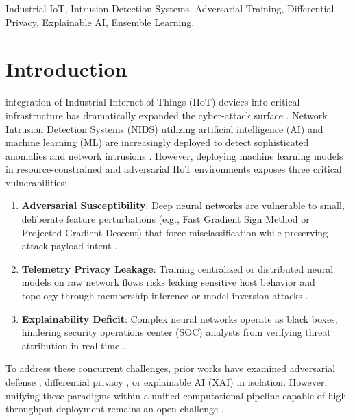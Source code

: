 \documentclass[10pt,journal,compsoc,twocolumn]{IEEEtran}
\begin{document}
\begin{IEEEkeywords}
Industrial IoT, Intrusion Detection Systems, Adversarial Training, Differential Privacy, Explainable AI, Ensemble Learning.
\end{IEEEkeywords}

\section{Introduction}
 integration of Industrial Internet of Things (IIoT) devices into critical infrastructure has dramatically expanded the cyber-attack surface \cite{harbi2024roadmap}. Network Intrusion Detection Systems (NIDS) utilizing artificial intelligence (AI) and machine learning (ML) are increasingly deployed to detect sophisticated anomalies and network intrusions \cite{khazane2024holistic, isaaf2024framework}. However, deploying machine learning models in resource-constrained and adversarial IIoT environments exposes three critical vulnerabilities:

\begin{enumerate}
    \item \textbf{Adversarial Susceptibility}: Deep neural networks are vulnerable to small, deliberate feature perturbations (e.g., Fast Gradient Sign Method or Projected Gradient Descent) that force misclassification while preserving attack payload intent \cite{goodfellow2015explaining, madry2018towards}.
    \item \textbf{Telemetry Privacy Leakage}: Training centralized or distributed neural models on raw network flows risks leaking sensitive host behavior and topology through membership inference or model inversion attacks \cite{shokri2017membership, nasr2018machine}.
    \item \textbf{Explainability Deficit}: Complex neural networks operate as black boxes, hindering security operations center (SOC) analysts from verifying threat attribution in real-time \cite{lundberg2017unified}.
\end{enumerate}

To address these concurrent challenges, prior works have examined adversarial defense \cite{ma2025backdoor, alshahrani2021adversarial, papernot2016crafting}, differential privacy \cite{abadi2016deep, mironov2017renyi}, or explainable AI (XAI) \cite{sharaf2024identifying, Frontiers2024evaluating} in isolation. However, unifying these paradigms within a unified computational pipeline capable of high-throughput deployment remains an open challenge \cite{yousefi2023differentially}.
\end{document}
